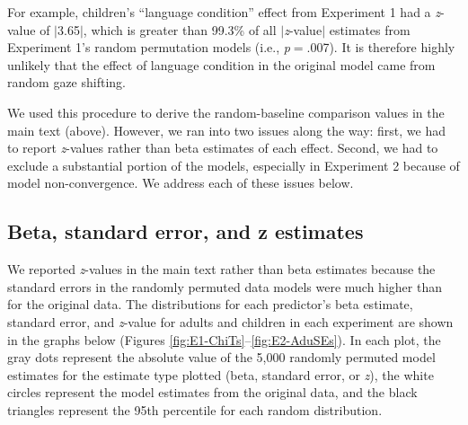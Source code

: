 \documentclass[authoryear, 12pt]{elsarticle}
\begin{document}
\newpage

For example, children's ``language condition'' effect from Experiment 1 had a \textit{z}-value of $|$3.65$|$, which is greater than 99.3\% of all $|$\textit{z}-value$|$ estimates from Experiment 1's random permutation models (i.e., \textit{p}$=$.007). It is therefore highly unlikely that the effect of language condition in the original model came from random gaze shifting.

We used this procedure to derive the random-baseline comparison values in the main text (above). However, we ran into two issues along the way: first, we had to report \textit{z}-values rather than beta estimates of each effect. Second, we had to exclude a substantial portion of the models, especially in Experiment 2 because of model non-convergence. We address each of these issues below.

\subsection{Beta, standard error, and z estimates}
We reported \textit{z}-values in the main text rather than beta estimates because the standard errors in the randomly permuted data models were much higher than for the original data. The distributions for each predictor's beta estimate, standard error, and \textit{z}-value for adults and children in each experiment are shown in the graphs below (Figures \ref{fig:E1-ChiTs}--\ref{fig:E2-AduSEs}). In each plot, the gray dots represent the absolute value of the 5,000 randomly permuted model estimates for the estimate type plotted (beta, standard error, or \textit{z}), the white circles represent the model estimates from the original data, and the black triangles represent the 95th percentile for each random distribution.
\end{document}
